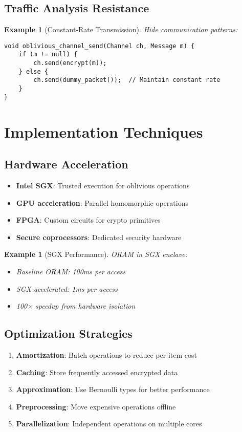 \documentclass[11pt,final,hidelinks]{article}
\newtheorem{example}[theorem]{Example}
\begin{document}
{\subsection{Traffic Analysis Resistance}

\begin{example}[Constant-Rate Transmission]
Hide communication patterns:
\begin{verbatim}
void oblivious_channel_send(Channel ch, Message m) {
    if (m != null) {
        ch.send(encrypt(m));
    } else {
        ch.send(dummy_packet());  // Maintain constant rate
    }
}
\end{verbatim}
\end{example}

\section{Implementation Techniques}

\subsection{Hardware Acceleration}

\begin{itemize}
    \item \textbf{Intel SGX}: Trusted execution for oblivious operations
    \item \textbf{GPU acceleration}: Parallel homomorphic operations
    \item \textbf{FPGA}: Custom circuits for crypto primitives
    \item \textbf{Secure coprocessors}: Dedicated security hardware
\end{itemize}

\begin{example}[SGX Performance]
ORAM in SGX enclave:
\begin{itemize}
    \item Baseline ORAM: 100ms per access
    \item SGX-accelerated: 1ms per access
    \item 100× speedup from hardware isolation
\end{itemize}
\end{example}

\subsection{Optimization Strategies}

\begin{enumerate}
    \item \textbf{Amortization}: Batch operations to reduce per-item cost
    \item \textbf{Caching}: Store frequently accessed encrypted data
    \item \textbf{Approximation}: Use Bernoulli types for better performance
    \item \textbf{Preprocessing}: Move expensive operations offline
    \item \textbf{Parallelization}: Independent operations on multiple cores
\end{enumerate}

}
\end{document}
